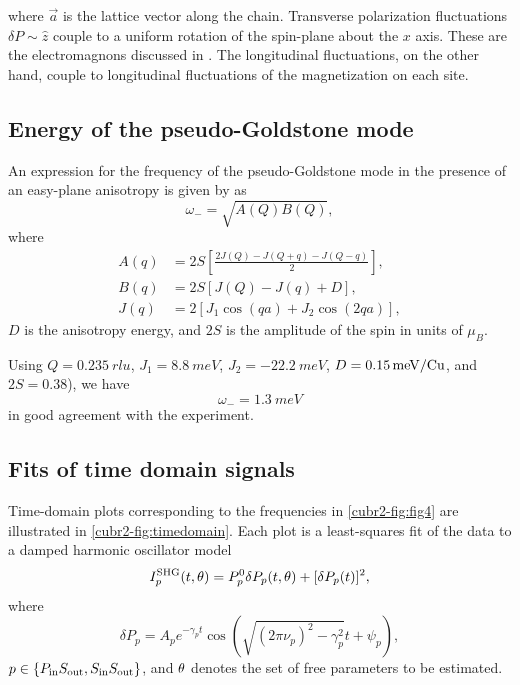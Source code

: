 where $\vec a$ is the lattice vector along the chain.
Transverse polarization fluctuations $\delta P \sim \hat z$ couple to a uniform rotation of the spin-plane about the $x$ axis.
These are the electromagnons discussed in \citet{katsura_dynamical_2007}.
The longitudinal fluctuations, on the other hand, couple to longitudinal fluctuations of the magnetization on each site.

\subsection{Energy of the pseudo-Goldstone mode}\label{cubr2-sup:anisotropyenergy}
An expression for the frequency of the pseudo-Goldstone mode in the presence of an easy-plane anisotropy is given by \citet{katsura_dynamical_2007} as
\begin{equation}
\omega_- = \sqrt{A(Q)B(Q)},
\end{equation}
where
\begin{align}
A(q) &= 2S\left[\frac{2J(Q)-J(Q+q)-J(Q-q)}{2}\right],\\
B(q) &= 2S\left[J(Q)-J(q)+D\right],\\
J(q) &= 2\left[J_1\cos(qa)+J_2\cos(2qa)\right],
\end{align}
$D$ is the anisotropy energy, and $2S$ is the amplitude of the spin in units of $\mu_B$.

Using $Q=\qty{0.235}{rlu}$\citep{zhao_cubr2_2012}, $J_1=\qty{8.8}{meV}$\citep{lebernegg_magnetism_2013}, $J_2=\qty{-22.2}{meV}$\citep{lebernegg_magnetism_2013}, $D=\qty{0.15}{meV/\ce{Cu}}$\citep{lee_investigation_2012}, and $2S=\num{0.38}$\citep{lee_investigation_2012}), we have
\begin{equation}
\omega_- = \qty{1.3}{meV}
\end{equation}
in good agreement with the experiment.

\subsection{Fits of time domain signals}\label{cubr2-sup:timedomain}
Time-domain plots corresponding to the frequencies in \cref{cubr2-fig:fig4} are illustrated in \cref{cubr2-fig:timedomain}.
Each plot is a least-squares fit of the data to a damped harmonic oscillator model
\begin{equation}
I^\mathrm{SHG}_p(t, \theta) = P^0_p\delta P_p(t, \theta)+[\delta P_p(t)]^2,
\end{equation}
where
\begin{equation}\label{cubr2-eq:model}
\delta P_p = A_pe^{-\gamma_p t}\cos\left(\sqrt{(2\pi\nu_p)^2-\gamma_p^2}t+\psi_p\right),
\end{equation}
$p \in \{P_\mathrm{in}S_\mathrm{out}, S_\mathrm{in}S_\mathrm{out}\}$, and $\theta$ denotes the set of free parameters to be estimated.

